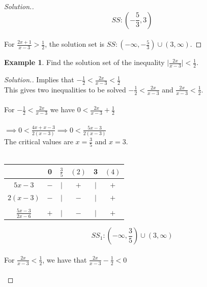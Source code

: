 \documentclass[11pt,a4paper]{article}
\theoremstyle{definition}
\newtheorem{example}[thm]{Example}
\newenvironment{solution}
  {\renewcommand{\qedsymbol}{}\begin{proof}[\textit{Solution}.]}
  {\end{proof}}
\begin{document}
\begin{solution}
$$SS:\left(-\frac{5}{3},3\right)$$\\

For $\frac{2x+1}{x-3}>\frac{1}{2}$, the solution set is $SS:\left(-\infty,-\frac{5}{3}\right)\cup (3,\infty)$.
\end{solution}
\begin{example}

Find the solution set of the inequality $\bigg|\frac{2x}{x-3}\bigg|<\frac{1}{2}$.
\end{example}
\begin{solution}

Implies that $-\frac{1}{2}<\frac{2x}{x-3}<\frac{1}{2}$\\

This gives two inequalities to be solved $-\frac{1}{2}<\frac{2x}{x-3}$ and $\frac{2x}{x-3}<\frac{1}{2}$.\\\\

For $-\frac{1}{2}<\frac{2x}{x-3}$ we have $0<\frac{2x}{x-3}+\frac{1}{2}$\\\\

$\implies 0<\frac{4x+x-3}{2(x-3)}\implies 0<\frac{5x-3}{2(x-3)}$\\

The critical values are $x=\frac{3}{5}$ and $x=3$.\\\\



\begin{table}[H]
\centering
\begin{tabular}{cccccc}
& 0 & $\frac{3}{5}$ & $(2)$ & 3 & $(4)$\\
\hline
\multicolumn{1}{c|}{$5x-3$}  & $-$ & $|$ & $+$ & $|$ & $+$\\
\multicolumn{1}{c|}{$2(x-3)$} & $-$ & $|$ & $-$ & $|$ & $+$\\
\multicolumn{1}{c|}{}&&&&&\\
\multicolumn{1}{c|}{$\frac{5x-3}{2x-6}$} & $+$ & $|$ & $-$ & $|$& $+$\\
\end{tabular}
\end{table}

$$SS_1:\left(-\infty,\frac{3}{5}\right)\cup (3,\infty)$$\\


For $\frac{2x}{x-3}<\frac{1}{2}$, we have that $\frac{2x}{x-3}-\frac{1}{2}<0$\\\\


\end{solution}
\end{document}
